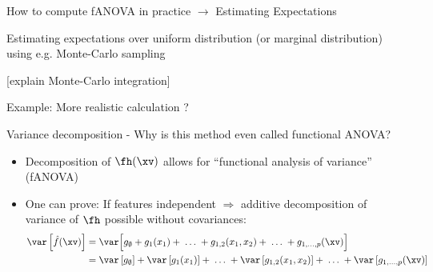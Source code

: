 \documentclass[11pt,compress,t,notes=noshow, aspectratio=169, xcolor=table]{beamer}
\newcommand{\open}{}
\newcommand{\close}{}
\begin{document}
\begin{frame}{How to compute fANOVA in practice $\rightarrow$ Estimating Expectations}

    Estimating expectations over uniform distribution (or marginal distribution) using e.g. Monte-Carlo sampling

    [explain Monte-Carlo integration]
    
\end{frame}

\begin{frame}{Example: More realistic calculation ?}
    
\end{frame}

\begin{frame}{Variance decomposition - Why is this method even called functional ANOVA?}

\begin{itemize}[<+->]
\item Decomposition of $\fh(\xv)$ allows for ``functional analysis of variance'' (fANOVA)
\item One can prove: 
If features independent $\Rightarrow$ additive decomposition of variance of $\fh$ possible without covariances:
\begin{align*}
\var\left[\hat{f}(\xv)\right]
&=  \var \Big[g_{\open \emptyset \close} + g_{\open 1 \close}(x_1) + \;\dots\; + g_{\open 1, 2 \close}(x_1, x_2) + \;\dots\; + g_{\open 1,\ldots,p \close}(\xv) \Big] \\
&= \var\left[g_{\open \emptyset \close}\right] + \var\left[g_{\open 1 \close}(x_1)\right] + \;\dots\; + \var\left[g_{\open 1, 2 \close}(x_1, x_2)\right] + \;\dots\; + \var\left[g_{\open 1,\ldots,p \close}(\xv)\right]
\end{align*}


\end{itemize}
\end{frame}
\end{document}
